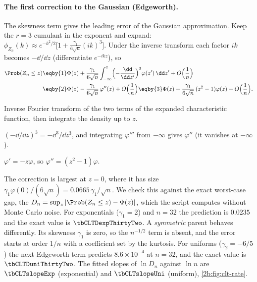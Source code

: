 \paragraph{The first correction to the Gaussian (Edgeworth).} The skewness term gives the leading error of the Gaussian approximation. Keep the $r=3$ cumulant in the exponent and expand: $\phi_{Z_n}(k)\approx e^{-k^2/2}\bigl[1+\frac{\gamma_1}{6\sqrt n}(ik)^3\bigr]$. Under the inverse transform each factor $ik$ becomes $-\dd/\dd z$ (differentiate $e^{-ikz}$), so
\begin{align}
  \Prob(Z_n\le z)
  &\eqby{1} \Phi(z)+\frac{\gamma_1}{6\sqrt n}\int_{-\infty}^{z}\Bigl(-\frac{\dd}{\dd z'}\Bigr)^3\varphi(z')\,\dd z'+O\Bigl(\frac1n\Bigr) \nonumber\\
  &\eqby{2} \Phi(z)-\frac{\gamma_1}{6\sqrt n}\,\varphi''(z)+O\Bigl(\frac1n\Bigr)
  \eqby{3} \Phi(z)-\frac{\gamma_1}{6\sqrt n}\,(z^2-1)\varphi(z)+O\Bigl(\frac1n\Bigr) .
  \label{2b:eq:edgeworth}
\end{align}
\begin{explain}
  \item Inverse Fourier transform of the two terms of the expanded characteristic function, then integrate the density up to $z$.
  \item $(-\dd/\dd z)^3=-\dd^3/\dd z^3$, and integrating $\varphi'''$ from $-\infty$ gives $\varphi''$ (it vanishes at $-\infty$).
  \item $\varphi'=-z\varphi$, so $\varphi''=(z^2-1)\varphi$.
\end{explain}
The correction is largest at $z=0$, where it has size $\gamma_1\varphi(0)/(6\sqrt n)=0.0665\,\gamma_1/\sqrt n$. We check this against the exact worst-case gap, the  $D_n=\sup_z|\Prob(Z_n\le z)-\Phi(z)|$, which the script computes without Monte Carlo noise. For exponentials ($\gamma_1=2$) and $n=32$ the prediction is $0.0235$ and the exact value is $\tbCLTDexpThirtyTwo$. A \emph{symmetric} parent behaves differently. Its skewness $\gamma_1$ is zero, so the $n^{-1/2}$ term is absent, and the error starts at order $1/n$ with a coefficient set by the kurtosis. For uniforms ($\gamma_2=-6/5$) the next Edgeworth term predicts $8.6\times10^{-4}$ at $n=32$, and the exact value is $\tbCLTDuniThirtyTwo$. The fitted slopes of $\ln D_n$ against $\ln n$ are $\tbCLTslopeExp$ (exponential) and $\tbCLTslopeUni$ (uniform), \cref{2b:fig:clt-rate}.

